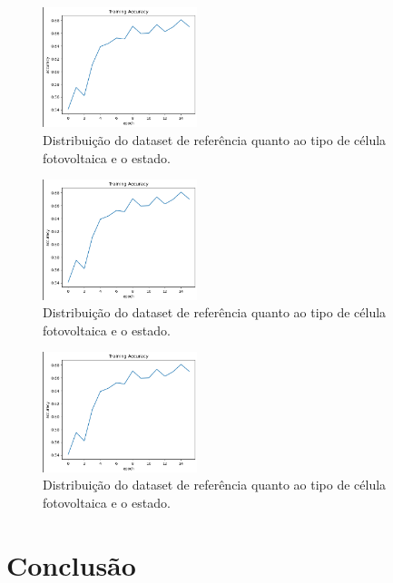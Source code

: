 \documentclass[conference]{IEEEtran}
\begin{document}
\begin{figure}[htbp]

    \centerline{\includegraphics[width=0.4\textwidth]{images/training-accuracy.png}}
    \caption{Distribuição do dataset de referência quanto ao tipo de célula
        fotovoltaica e o estado.}
    \label{fig:training-accuracy}
\end{figure}
\begin{figure}[htbp]

    \centerline{\includegraphics[width=0.4\textwidth]{images/training-accuracy.png}}
    \caption{Distribuição do dataset de referência quanto ao tipo de célula
        fotovoltaica e o estado.}
    \label{fig:training-loss}
\end{figure}
\begin{figure}[htbp]

    \centerline{\includegraphics[width=0.4\textwidth]{images/training-accuracy.png}}
    \caption{Distribuição do dataset de referência quanto ao tipo de célula
        fotovoltaica e o estado.}
    \label{fig:confusion-matrix}
\end{figure}

\section{Conclusão}
\end{document}

